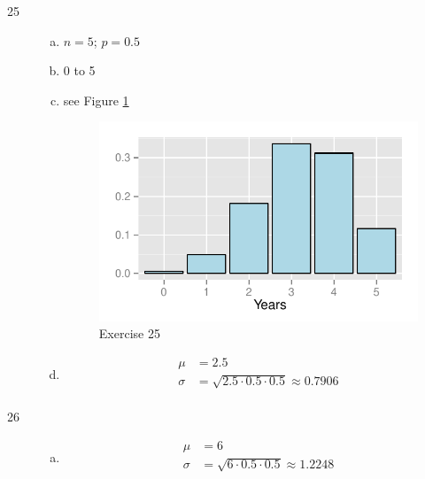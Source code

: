 \documentclass[letterpaper, landscape]{exam}
\begin{document}
\begin{description}
      \item[25]
        \begin{enumerate}[(a)]
          \item $n = 5$; $p = 0.5$

          \item 0 to 5

          \item see Figure \ref{fig:ex25}

            \begin{figure}[H]
              \centering
              \includegraphics{ex25.pdf}
              \caption{Exercise 25}
              \label{fig:ex25}
            \end{figure}

          \item 
            \begin{align*}
              \mu    & = \boxed{ 2.5 } \\
              \sigma & = \sqrt{2.5 \cdot 0.5 \cdot 0.5} \approx \boxed{ 0.7906 } \\
            \end{align*}
        \end{enumerate}

      \item[26]
        \begin{enumerate}[(a)]
          \item 
            \begin{align*}
              \mu    & = \boxed{ 6 } \\
              \sigma & = \sqrt{6 \cdot 0.5 \cdot 0.5} \approx \boxed{ 1.2248 } \\
            \end{align*}


\end{enumerate}
\end{description}
\end{document}

